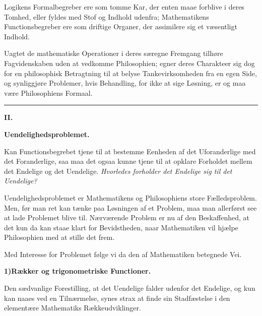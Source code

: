 \documentclass[12pt]{book}
\newcommand{\opage}[1]{\marginnote{\footnotesize\textit{[#1]}}}
\begin{document}
Logikens Formalbegreber ere som tomme Kar, der enten maae forblive i deres
Tomhed, eller fyldes med Stof og Indhold udenfra; Mathematikens
Functionsbegreber ere som driftige Organer, der assimilere sig et væsentligt
Indhold.

Uagtet de mathematiske Operationer i deres særegne Fremgang tilhøre
Fagvidenskaben uden at vedkomme Philosophien; egner deres Charakteer sig dog for
en philosophisk Betragtning til at belyse Tankevirksomheden fra en egen Side, og
synliggjøre Problemer, hvis Behandling, for ikke at sige Løsning, er og maa være
Philosophiens Formaal.

\begin{center}\rule{2.5cm}{0.4pt}\end{center}

\begin{center}
  {\large\bfseries II.}\par\vspace{4pt}
  {\Large\bfseries Uendelighedsproblemet.}
\end{center}
{}

Kan Functionsbegrebet tjene til at bestemme Eenheden af det Uforanderlige med det
Foranderlige, saa maa det ogsaa kunne tjene til at opklare Forholdet mellem det
Endelige og det Uendelige. \emph{Hvorledes forholder det Endelige sig til det
Uendelige?}

Uendelighedsproblemet er Mathematikens og Philosophiens store Fælledsproblem.
Men, før man ret kan tænke paa Løsningen af et Problem, maa man allerførst see at
lade Problemet blive til. Nærværende Problem er nu af
\opage{20} den Beskaffenhed, at det kun da kan staae klart for Bevidstheden, naar
Mathematiken vil hjælpe Philosophien med at stille det frem.

Med Interesse for Problemet følge vi da den af Mathematiken betegnede Vei.

\begin{center}
  {\bfseries 1)\quad Rækker og trigonometriske Functioner.}
\end{center}
{}

Den sædvanlige Forestilling, at det Uendelige falder udenfor det Endelige, og kun
kan naaes ved en Tilnærmelse, synes strax at finde sin Stadfæstelse i den
elementære Mathematiks Rækkeudviklinger.
\end{document}
